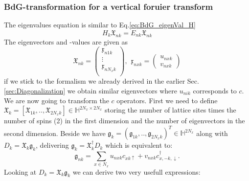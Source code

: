 \documentclass[../main.tex]{subfile}
\begin{document}
\subsubsection{BdG-transformation for a vertical foruier transform}
The eigenvalues equation is similar to Eq.\ref{eq:BdG_eigenVal_H}
\begin{equation}\label{eq:BdG_eigenVal_H_k}
    H_k \mathfrak{X}_{nk} = E_{nk} \mathfrak{X}_{nk}
\end{equation}
The eigenvectors and -values are given as
\begin{equation*}
    \mathfrak{X}_{nk} = \begin{pmatrix}
        \mathfrak{x}_{n1k}\\
        \vdots\\
        \mathfrak{x}_{nN_xk}\\
    \end{pmatrix},~~ \mathfrak{x}_{nxk} = \begin{pmatrix}
        u_{nxk}\\
        v_{nxk}
    \end{pmatrix}
\end{equation*}
if we stick to the formalism we already derived in the earlier Sec.\ref{sec:Diagonalization} we obtain similar 
eigenvectors where $u_{nik}$ corresponds to $c$. We are now going to transform the $c$ operators. First we need
to define $\mathfrak{X}_k = [\mathfrak{X}_{1k}, ..,\mathfrak{X}_{2N_xk}]\in\mathbb{H}^{2N_x\times 2N_x}$ storing the number of 
lattice sites times the number of spins (2) in the first dimension and 
the number of eigenvectors in the second dimension. Beside we have $\mathfrak{g}_k = (\mathfrak{g}_{1k}, .., \mathfrak{g}_{2N_xk})^T\in\mathbb{H}^{2N_x}$ along with $D_{k} = \mathfrak{X}_k\mathfrak{g}_k$,
delivering $\mathfrak{g}_k = \mathfrak{X}^{\dagger}_k D_{k}$ which is equivalent to:
\begin{equation}
    \mathfrak{g}_{nk} = \sum_{x\in{N_x}} u_{nxk}c_{xk\uparrow} + v_{nxk}c^{\dagger}_{x,-k,\downarrow}.
\end{equation}
Looking at $D_{k} = \mathfrak{X}_k\mathfrak{g}_k$ we can derive two very usefull expressions:
\end{document}

